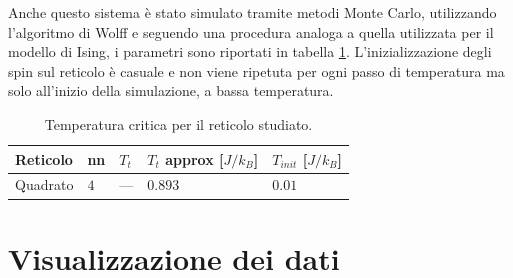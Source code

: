 \documentclass{article}
\begin{document}
Anche questo sistema è stato simulato tramite metodi Monte Carlo, utilizzando l'algoritmo di Wolff e seguendo una procedura analoga a quella utilizzata per il modello di Ising, i parametri sono riportati in tabella \ref{tab:ltXY}.
L'inizializzazione degli spin sul reticolo è casuale e non viene ripetuta per ogni passo di temperatura ma solo all'inizio della simulazione, a bassa temperatura.

\begin{table}[ht]
\begin{center}
\begin{tabular}{lllll}
\toprule
Reticolo & nn & $T_t$ & $T_t$ approx [$J/k_B$] & $T_{init}$ [$J/k_B$]\\
\midrule
Quadrato & $4$ & --- & $0.893$ & $0.01$\\
\bottomrule
\end{tabular}
\end{center}
\caption{Temperatura critica per il reticolo studiato.}
\label{tab:ltXY}
\end{table}

\section{Visualizzazione dei dati}
\end{document}

